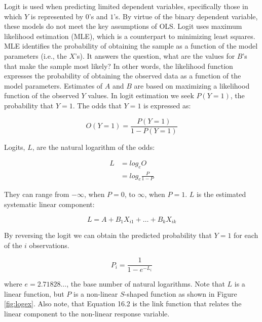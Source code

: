 \documentclass[11pt,openany]{book}\usepackage[]{graphicx}\usepackage[]{color}
\begin{document}
Logit is used when predicting limited dependent variables,
specifically those in which $Y$ is represented by $0$’s and $1$’s.
By virtue of the binary dependent variable, these models do not meet the
key assumptions of OLS. Logit uses maximum likelihood estimation (MLE),
which is a counterpart to minimizing least squares. 
MLE identifies the probability of obtaining the sample as a function
of the model parameters (i.e., the $X$’s). It answers the question, 
what are the values for $B$’s that make the sample most likely? In
other words, the likelihood 
function expresses the probability of obtaining the observed data as a
function of the model parameters. Estimates of $A$ and $B$ are based
on maximizing a likelihood function of the observed $Y$ values.  
In logit estimation we seek $P(Y=1)$, the probability that $Y=1$. The
odds that $Y=1$ is expressed as:

\begin{equation*}
  O(Y=1)=\frac{P(Y=1)}{1-P(Y=1)}
\end{equation*}

\noindent Logits, $L$, are the natural logarithm of the odds: 

\begin{align*}
  L &= log_e O \\
  &=log_e \frac{P}{1-P}
\end{align*}

\noindent They can range from $-\infty$, when $P=0$, to $\infty$, when
$P=1$. $L$ is the estimated systematic linear component: 

\begin{equation*}
  L = A+B_1 X_{i1}+\ldots+B_k X_{ik}
\end{equation*}

\noindent By reversing the logit we can obtain the predicted
probability that $Y=1$ for each of the $i$ observations. 

\begin{equation}
  \label{eq:predprob}
  P_{i} = \frac{1}{1-e^{-L_{i}}}
\end{equation}

\noindent where $e=2.71828 \ldots$, the base number of natural
logarithms. Note that $L$ is a linear function, but $P$ is a non-linear
$S$-shaped function as shown in Figure \ref{fig:logex}. Also note,
that Equation 16.2 is the link function that relates the
linear component to the non-linear response variable.  
\end{document}
